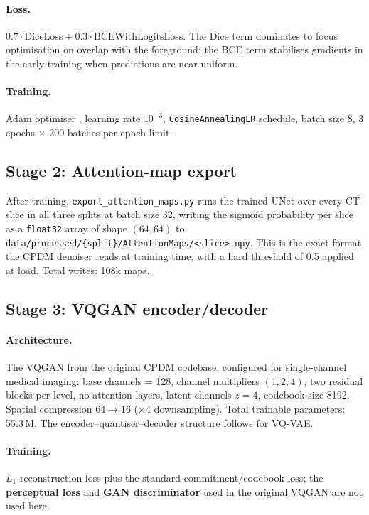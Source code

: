 \documentclass[11pt,a4paper]{article}
\begin{document}
\paragraph{Loss.} $0.7 \cdot \text{DiceLoss} + 0.3 \cdot \text{BCEWithLogitsLoss}$. 
The Dice term \parencite{milletari2016vnet} dominates to focus optimisation on 
overlap with the foreground; the BCE term stabilises gradients in the early 
training when predictions are near-uniform.

\paragraph{Training.} Adam optimiser \parencite{kingma2015adam}, learning rate 
$10^{-3}$, \texttt{CosineAnnealingLR} schedule, batch size 8, 3 epochs $\times$ 
200 batches-per-epoch limit. 

\subsection{Stage 2: Attention-map export}

After training, \texttt{export\_attention\_maps.py} runs the trained UNet 
over every CT slice in all three splits at batch size 32, writing the sigmoid 
probability per slice as a \texttt{float32} array of shape $(64, 64)$ to 
\texttt{data/processed/\{split\}/AttentionMaps/<slice>.npy}. This is the 
exact format the CPDM denoiser reads at training time, with a hard threshold 
of 0.5 applied at load. Total writes: 108k maps.

\subsection{Stage 3: VQGAN encoder/decoder}

\paragraph{Architecture.} The VQGAN \parencite{esser2021vqgan} from the original CPDM codebase, configured for single-channel medical imaging: base channels = 128, channel multipliers $(1, 2, 4)$, two residual blocks per level, no attention layers, latent channels $z = 4$, codebook size 8192. Spatial compression $64 \to 16$ ($\times 4$ downsampling). Total trainable parameters: 55.3\,M. The encoder--quantiser--decoder structure follows \textcite{oord2017vqvae} for VQ-VAE.

\paragraph{Training.} $L_1$ reconstruction loss plus the standard commitment/codebook 
loss; the \textbf{perceptual loss} \parencite{zhang2018lpips} and 
\textbf{GAN discriminator} \parencite{goodfellow2014gan, esser2021vqgan} used 
in the original VQGAN are not used here.
\end{document}
